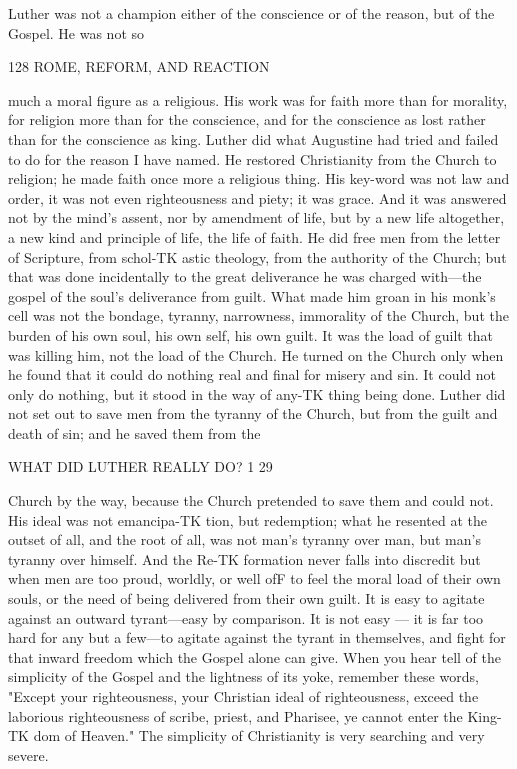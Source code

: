 \documentclass[12pt,a5paper,oneside]{book}
\begin{document}
Luther was not a champion either of the conscience 
or of the reason, but of the Gospel. He was not so 



128 ROME, REFORM, AND REACTION 

much a moral figure as a religious. His work was for 
faith more than for morality, for religion more than 
for the conscience, and for the conscience as lost 
rather than for the conscience as king. Luther did 
what Augustine had tried and failed to do for the 
reason I have named. He restored Christianity from 
the Church to religion; he made faith once more a 
religious thing. His key-word was not law and order, 
it was not even righteousness and piety; it was grace. 
And it was answered not by the mind's assent, nor by 
amendment of life, but by a new life altogether, a 
new kind and principle of life, the life of faith. He 
did free men from the letter of Scripture, from schol-TK
astic theology, from the authority of the Church; but 
that was done incidentally to the great deliverance he 
was charged with---the gospel of the soul's deliverance 
from guilt. What made him groan in his monk's cell 
was not the bondage, tyranny, narrowness, immorality 
of the Church, but the burden of his own soul, his 
own self, his own guilt. It was the load of guilt that 
was killing him, not the load of the Church. He 
turned on the Church only when he found that it could 
do nothing real and final for misery and sin. It could 
not only do nothing, but it stood in the way of any-TK
thing being done. Luther did not set out to save men 
from the tyranny of the Church, but from the guilt 
and death of sin; and he saved them from the 



WHAT DID LUTHER REALLY DO? 1 29 

Church by the way, because the Church pretended to 
save them and could not. His ideal was not emancipa-TK
tion, but redemption; what he resented at the outset 
of all, and the root of all, was not man's tyranny over 
man, but man's tyranny over himself. And the Re-TK
formation never falls into discredit but when men are 
too proud, worldly, or well ofF to feel the moral load 
of their own souls, or the need of being delivered 
from their own guilt. It is easy to agitate against an 
outward tyrant---easy by comparison. It is not easy 
— it is far too hard for any but a few---to agitate 
against the tyrant in themselves, and fight for that 
inward freedom which the Gospel alone can give. 
When you hear tell of the simplicity of the Gospel 
and the lightness of its yoke, remember these words, 
"Except your righteousness, your Christian ideal of 
righteousness, exceed the laborious righteousness of 
scribe, priest, and Pharisee, ye cannot enter the King-TK
dom of Heaven." The simplicity of Christianity is 
very searching and very severe. 
\end{document}
